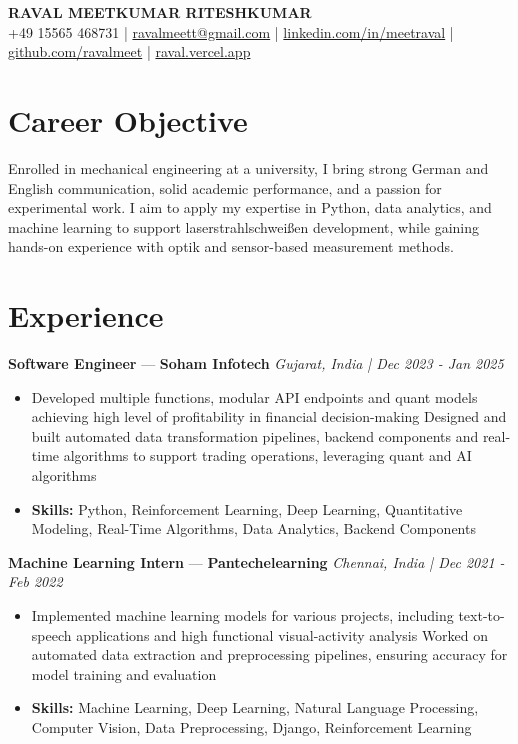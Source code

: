 \documentclass[a4paper,10pt]{article}
\begin{document}
\begin{center}
  {\Large\bfseries RAVAL MEETKUMAR RITESHKUMAR}\\[2pt]
  {\small +49 15565 468731 \;|\; \href{mailto:ravalmeett@gmail.com}{ravalmeett@gmail.com} \;|\; \href{https://www.linkedin.com/in/meetraval/}{linkedin.com/in/meetraval} \;|\; \href{https://github.com/ravalmeet}{github.com/ravalmeet} \;|\; \href{https://raval.vercel.app/}{raval.vercel.app}}
\end{center}
\vspace{-3pt}

\section*{Career Objective}
Enrolled in mechanical engineering at a university, I bring strong German and English communication, solid academic performance, and a passion for experimental work. I aim to apply my expertise in Python, data analytics, and machine learning to support laserstrahlschweißen development, while gaining hands-on experience with optik and sensor-based measurement methods.\par

\section*{Experience}
\textbf{Software Engineer} — \textbf{Soham Infotech} \hfill \textit{Gujarat, India \;|\; Dec 2023 - Jan 2025}\par
\vspace{1pt}
\begin{itemize}
  \item Developed multiple functions, modular API endpoints and quant models achieving high level of profitability in financial decision-making Designed and built automated data transformation pipelines, backend components and real-time algorithms to support trading operations, leveraging quant and AI algorithms
  \item \textbf{Skills:} Python, Reinforcement Learning, Deep Learning, Quantitative Modeling, Real-Time Algorithms, Data Analytics, Backend Components
\end{itemize}
\vspace{3pt}
\textbf{Machine Learning Intern} — \textbf{Pantechelearning} \hfill \textit{Chennai, India \;|\; Dec 2021 - Feb 2022}\par
\vspace{1pt}
\begin{itemize}
  \item Implemented machine learning models for various projects, including text-to-speech applications and high functional visual-activity analysis Worked on automated data extraction and preprocessing pipelines, ensuring accuracy for model training and evaluation
  \item \textbf{Skills:} Machine Learning, Deep Learning, Natural Language Processing, Computer Vision, Data Preprocessing, Django, Reinforcement Learning
\end{itemize}
\end{document}
